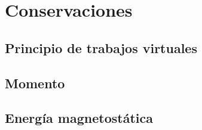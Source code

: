 \documentclass[11pt,a4paper]{article}
\numberwithin{equation}{section}
\begin{document}
\section{Conservaciones}

\subsection{Principio de trabajos virtuales}

\subsection{Momento}

\subsection{Energía magnetostática}
\end{document}
